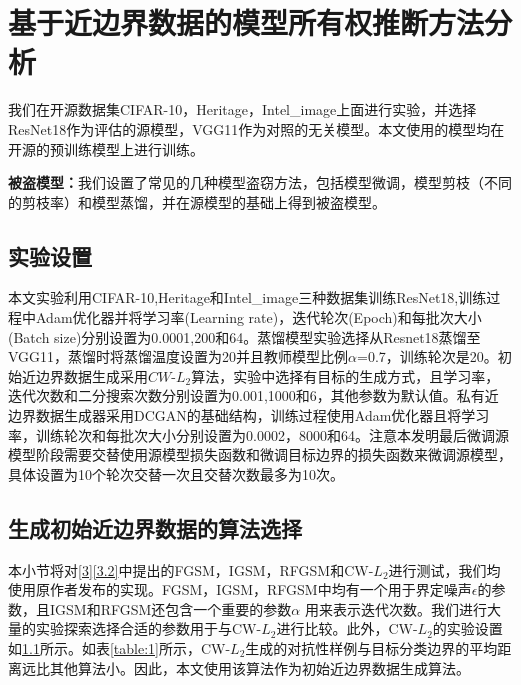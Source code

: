 
\chapter{基于近边界数据的模型所有权推断方法分析}\label{5}

我们在开源数据集CIFAR-10\cite{krizhevsky2009learning}，Heritage\cite{Heritage}，Intel\_image\cite{Intel_image}上面进行实验，并选择ResNet18作为评估的源模型，VGG11作为对照的无关模型。本文使用的模型均在开源的预训练模型上进行训练。

\noindent\textbf{被盗模型：}我们设置了常见的几种模型盗窃方法，包括模型微调，模型剪枝（不同的剪枝率）和模型蒸馏，并在源模型的基础上得到被盗模型。

\section{实验设置}\label{5.1}

本文实验利用CIFAR-10,Heritage和Intel\_image三种数据集训练ResNet18,训练过程中Adam优化器并将学习率(Learning rate)，迭代轮次(Epoch)和每批次大小(Batch size)分别设置为0.0001,200和64。蒸馏模型实验选择从Resnet18蒸馏至VGG11，蒸馏时将蒸馏温度设置为20并且教师模型比例$\alpha$=0.7，训练轮次是20。初始近边界数据生成采用$CW$-$L_2$算法，实验中选择有目标的生成方式，且学习率，迭代次数和二分搜索次数分别设置为0.001,1000和6，其他参数为默认值。私有近边界数据生成器采用DCGAN的基础结构，训练过程使用Adam优化器且将学习率，训练轮次和每批次大小分别设置为0.0002，8000和64。注意本发明最后微调源模型阶段需要交替使用源模型损失函数和微调目标边界的损失函数来微调源模型，具体设置为10个轮次交替一次且交替次数最多为10次。



\section{生成初始近边界数据的算法选择}\label{5.2}

本小节将对\ref{3}\ref{3.2}中提出的FGSM，IGSM，RFGSM和CW-$L_2$进行测试，我们均使用原作者发布的实现。FGSM，IGSM，RFGSM中均有一个用于界定噪声$\epsilon$的参数，且IGSM和RFGSM还包含一个重要的参数$\alpha$ 用来表示迭代次数。我们进行大量的实验探索选择合适的参数用于与CW-$L_2$进行比较。此外，CW-$L_2$的实验设置如\ref{5.1}所示。如表\ref{table:1}所示，CW-$L_2$生成的对抗性样例与目标分类边界的平均距离远比其他算法小。因此，本文使用该算法作为初始近边界数据生成算法。

